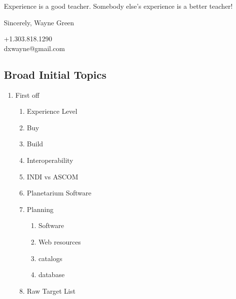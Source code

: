 \documentclass[letter,11pt,oneside]{article}
\begin{document}
Experience is a good teacher. Somebody else's experience is a better
teacher!

Sincerely, Wayne Green

+1.303.818.1290 \\
dxwayne@gmail.com

\subsection{Broad Initial Topics}

\vspace{-.15cm}
\begin{enumerate}\addtolength{\itemsep}{-0.5\baselineskip}
   \item   First off
\vspace{-.15cm}
\begin{enumerate}\addtolength{\itemsep}{-0.5\baselineskip}
   \item   Experience Level
   \item   Buy
   \item   Build
   \item   Interoperability
   \item   INDI vs ASCOM
   \item   Planetarium Software
   \item   Planning
\vspace{-.15cm}
\begin{enumerate}\addtolength{\itemsep}{-0.5\baselineskip}
   \item   Software
   \item   Web resources
   \item   catalogs
   \item   database
\end{enumerate}

   \item   Raw Target List
\end{enumerate}
\end{enumerate}


\vspace{-.15cm}
\end{document}

